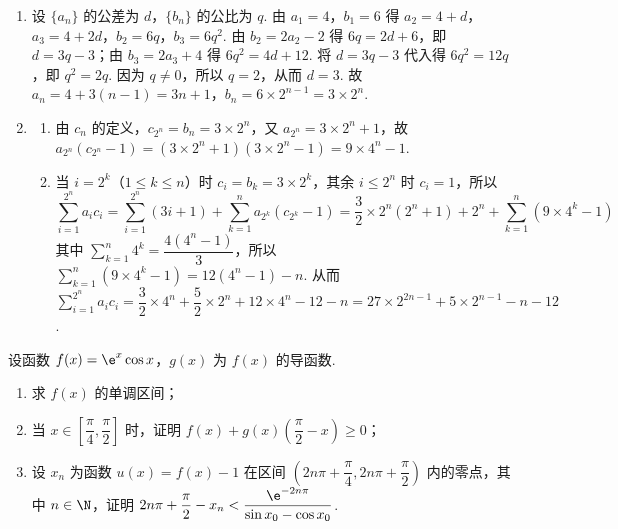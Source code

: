 \begin{solution}
\begin{enumerate}
\item 设 \(\{a_n\}\) 的公差为 \(d\)，\(\{b_n\}\) 的公比为 \(q\). 由 \(a_1=4\)，\(b_1=6\) 得 \(a_2=4+d\)，\(a_3=4+2d\)，\(b_2=6q\)，\(b_3=6q^2\). 由 \(b_2=2a_2-2\) 得 \(6q=2d+6\)，即 \(d=3q-3\)；由 \(b_3=2a_3+4\) 得 \(6q^2=4d+12\). 将 \(d=3q-3\) 代入得 \(6q^2=12q\)，即 \(q^2=2q\). 因为 \(q\ne0\)，所以 \(q=2\)，从而 \(d=3\). 故 \(a_n=4+3(n-1)=3n+1\)，\(b_n=6\times2^{n-1}=3\times2^n\).
\item
\begin{enumerate}
\item 由 \(c_n\) 的定义，\(c_{2^n}=b_n=3\times2^n\)，又 \(a_{2^n}=3\times2^n+1\)，故 \(a_{2^n}(c_{2^n}-1)=(3\times2^n+1)(3\times2^n-1)=9\times4^n-1\).
\item 当 \(i=2^k\)（\(1\le k\le n\)）时 \(c_i=b_k=3\times2^k\)，其余 \(i\le2^n\) 时 \(c_i=1\)，所以
\[
\sum_{i=1}^{2^n}a_ic_i=\sum_{i=1}^{2^n}(3i+1)+\sum_{k=1}^{n}a_{2^k}(c_{2^k}-1)=\frac32\times2^n(2^n+1)+2^n+\sum_{k=1}^{n}(9\times4^k-1)
\]
其中 \(\displaystyle\sum_{k=1}^{n}4^k=\dfrac{4(4^n-1)}{3}\)，所以 \(\displaystyle\sum_{k=1}^{n}(9\times4^k-1)=12(4^n-1)-n\). 从而 \(\displaystyle\sum_{i=1}^{2^n}a_ic_i=\dfrac32\times4^n+\dfrac52\times2^n+12\times4^n-12-n=27\times2^{2n-1}+5\times2^{n-1}-n-12\).
\end{enumerate}
\end{enumerate}
\end{solution}


\begin{problem}
设函数 \( f(x)=\e^x\cos x \)，\( g(x) \) 为 \( f(x) \) 的导函数.

\begin{enumerate}
\item 求 \( f(x) \) 的单调区间；
\item 当 \( x\in \left[ \dfrac{\pi}{4},\dfrac{\pi}{2} \right] \) 时，证明 \( f(x)+g(x)\left( \dfrac{\pi}{2}-x \right)\ge 0 \)；
\item 设 \( x_n \) 为函数 \( u(x)=f(x)-1 \) 在区间 \( \left( 2n\pi+\dfrac{\pi}{4},2n\pi+\dfrac{\pi}{2} \right) \) 内的零点，其中 \( n\in \N \)，证明
\(2n\pi+\dfrac{\pi}{2}-x_n<\dfrac{\e^{-2n\pi}}{\sin x_0-\cos x_0}\).
\end{enumerate}
\end{problem}

